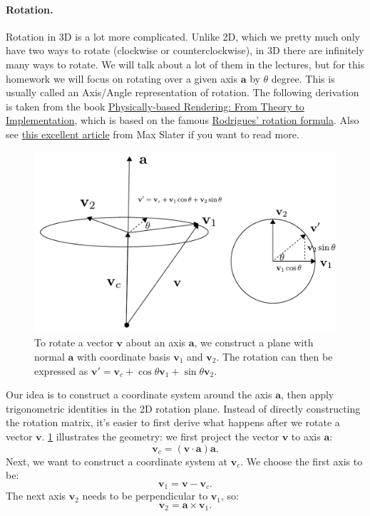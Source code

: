 \paragraph{Rotation.} Rotation in 3D is a lot more complicated. Unlike 2D, which we pretty much only have two ways to rotate (clockwise or counterclockwise), in 3D there are infinitely many ways to rotate. We will talk about a lot of them in the lectures, but for this homework we will focus on rotating over a given axis $\mathbf{a}$ by $\theta$ degree. This is usually called an Axis/Angle representation of rotation. The following derivation is taken from the book \href{https://www.pbr-book.org/3ed-2018/Geometry_and_Transformations/Transformations}{Physically-based Rendering: From Theory to Implementation}, which is based on the famous \href{https://en.wikipedia.org/wiki/Rodrigues%27_rotation_formula}{Rodrigues' rotation formula}. Also see \href{https://thenumb.at/Exponential-Rotations/}{this excellent article} from Max Slater if you want to read more.

\begin{figure}[h]
    \centering
    \includegraphics[width=0.5\linewidth]{imgs/rotate_axis.pdf}
    \caption{To rotate a vector $\mathbf{v}$ about an axis $\mathbf{a}$, we construct a plane with normal $\mathbf{a}$ with coordinate basis $\mathbf{v}_1$ and $\mathbf{v}_2$. The rotation can then be expressed as $\mathbf{v}' = \mathbf{v}_c + \cos\theta \mathbf{v}_1 + \sin\theta \mathbf{v}_2$.}
    \label{fig:rotate_axis}
\end{figure}

Our idea is to construct a coordinate system around the axis $\mathbf{a}$, then apply trigonometric identities in the 2D rotation plane. Instead of directly constructing the rotation matrix, it's easier to first derive what happens after we rotate a vector $\mathbf{v}$. \cref{fig:rotate_axis} illustrates the geometry: we first project the vector $\mathbf{v}$ to axis $\mathbf{a}$:
\begin{equation}
\mathbf{v}_c = \left(\mathbf{v} \cdot \mathbf{a}\right)\mathbf{a}.
\end{equation}
Next, we want to construct a coordinate system at $\mathbf{v}_c$. We choose the first axis to be:
\begin{equation}
\mathbf{v}_1 = \mathbf{v} - \mathbf{v}_c.
\end{equation}
The next axis $\mathbf{v}_2$ needs to be perpendicular to $\mathbf{v}_1$, so:
\begin{equation}
\mathbf{v}_2 = \mathbf{a} \times \mathbf{v}_1.
\end{equation}


